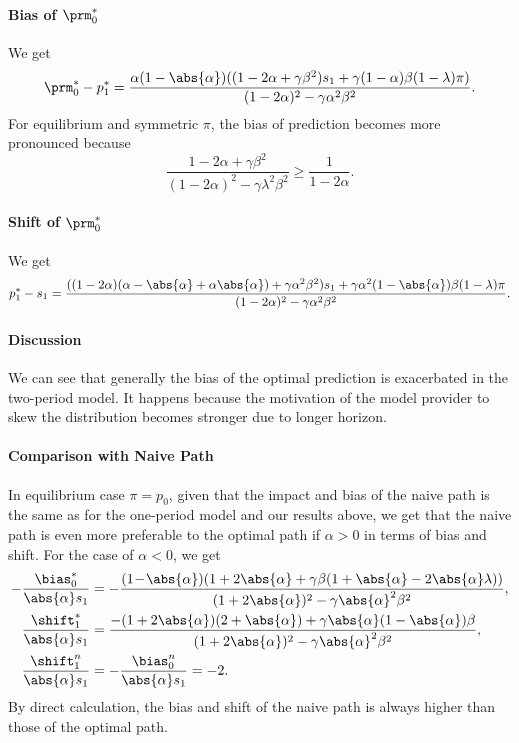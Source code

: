\paragraph{Bias of $\prm^*_0$}

We get
\[
    \prm^*_0 - p^*_1 = \frac{\alpha (1 - \abs{\alpha}) ((1 - 2 \alpha + \gamma
    \beta^2) s_1 + \gamma (1 - \alpha) \beta (1 - \lambda) \pi)}{(1 - 2
    \alpha)^2 - \gamma \alpha^2 \beta^2}.
\]
For equilibrium and symmetric $\pi$, the bias of prediction becomes more
pronounced because
\[
    \frac{1 - 2 \alpha + \gamma \beta^2}{(1 - 2 \alpha)^2 - \gamma \lambda^2
    \beta^2} \ge \frac{1}{1 - 2 \alpha}.
\]

\paragraph{Shift of $\prm^*_0$}

We get
\[
    p^*_1 - s_1 = \frac{((1 - 2 \alpha) (\alpha - \abs{\alpha} + \alpha
    \abs{\alpha}) + \gamma \alpha^2 \beta^2) s_1 + \gamma \alpha^2 (1 -
    \abs{\alpha}) \beta (1 - \lambda) \pi}{(1 - 2 \alpha)^2 - \gamma \alpha^2
    \beta^2}.
\]

\paragraph{Discussion}

We can see that generally the bias of the optimal prediction is exacerbated in
the two-period model. It happens because the motivation of the model provider
to skew the distribution becomes stronger due to longer horizon.

\paragraph{Comparison with Naive Path}

In equilibrium case $\pi = p_0$, given that the impact and bias of the naive
path is the same as for the one-period model and our results above, we get that
the naive path is even more preferable to the optimal path if $\alpha > 0$ in
terms of bias and shift. For the case of $\alpha < 0$, we get
\[
    \begin{split}
        -\frac{\bias^*_0}{\abs{\alpha} s_1} &= -\frac{(1 \! - \!
        \abs{\alpha}) (1 + 2 \abs{\alpha} + \gamma \beta (1 + \abs{\alpha} - 2
        \abs{\alpha} \lambda))}{(1 + 2 \abs{\alpha})^2 - \gamma \abs{\alpha}^2
        \beta^2},\\
        \frac{\shift^*_1}{\abs{\alpha} s_1} &= \frac{-(1 + 2 \abs{\alpha}) (2
        + \abs{\alpha}) + \gamma \abs{\alpha} (1 - \abs{\alpha}) \beta}{(1 + 2
        \abs{\alpha})^2 - \gamma \abs{\alpha}^2 \beta^2},\\
        \frac{\shift^n_1}{\abs{\alpha} s_1} &= -\frac{\bias^n_0}{\abs{\alpha}
        s_1} = -2.
    \end{split}
\]
By direct calculation, the bias and shift of the naive path is always higher
than those of the optimal path.

